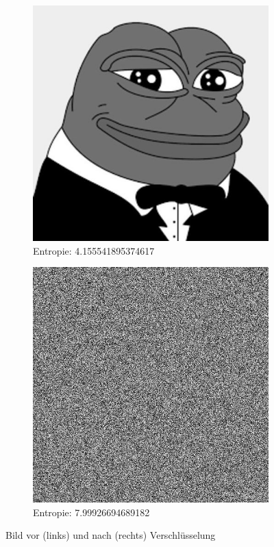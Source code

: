 \begin{figure}
	\centering

	\begin{subfigure}{0.35\textwidth}
		\includegraphics[width=\textwidth]{../1/3/gray_4.1555418953746175_frog.jpg}
		\caption{Entropie: 4.155541895374617}
	\end{subfigure}
	\hfill
	\begin{subfigure}{0.35\textwidth}
		\includegraphics[width=\textwidth]{../1/3/encrypted_7.99926694689182_frog.jpg}
		\caption{Entropie: 7.99926694689182}
	\end{subfigure}

	\caption{Bild vor (links) und nach (rechts) Verschlüsselung}
	\label{fig:frog}
\end{figure}

